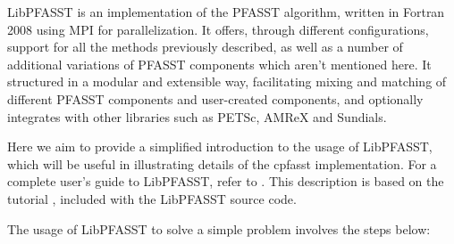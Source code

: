 LibPFASST \cite{libpfasst_github} is an implementation of the PFASST algorithm, written in Fortran 2008 using MPI for parallelization. It offers, through different configurations, support for all the methods previously described, as well as a number of additional variations of PFASST components which aren't mentioned here. It structured in a modular and extensible way, facilitating mixing and matching of different PFASST components and user-created components, and optionally integrates with other libraries such as PETSc, AMReX and Sundials.

Here we aim to provide a simplified introduction to the usage of LibPFASST, which will be useful in illustrating details of the cpfasst implementation. For a  complete user's guide to LibPFASST, refer to \cite{libpfasst_ug}. This description is based on the tutorial , included with the LibPFASST source code.

The usage of LibPFASST to solve a simple problem involves the steps below:


